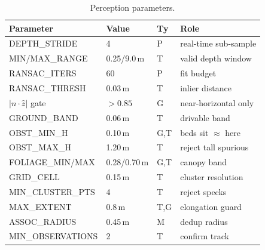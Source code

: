 \documentclass[10pt,journal,twoside]{IEEEtran}
\begin{document}
\begin{table}[!t]
\centering
\caption{Perception parameters.}
\label{tab:cfg1}
\footnotesize
\begin{tabular}{@{}lll l@{}}
\toprule
\textbf{Parameter} & \textbf{Value} & \textbf{Ty} & \textbf{Role} \\
\midrule
DEPTH\_STRIDE & 4 & P & real-time sub-sample \\
MIN/MAX\_RANGE & 0.25/9.0\,m & T & valid depth window \\
RANSAC\_ITERS & 60 & P & fit budget \\
RANSAC\_THRESH & 0.03\,m & T & inlier distance \\
$|n\cdot\hat z|$ gate & $>0.85$ & G & near-horizontal only \\
GROUND\_BAND & 0.06\,m & T & drivable band \\
OBST\_MIN\_H & 0.10\,m & G,T & beds sit $\approx$ here \\
OBST\_MAX\_H & 1.20\,m & T & reject tall spurious \\
FOLIAGE\_MIN/MAX & 0.28/0.70\,m & G,T & canopy band \\
GRID\_CELL & 0.15\,m & T & cluster resolution \\
MIN\_CLUSTER\_PTS & 4 & T & reject specks \\
MAX\_EXTENT & 0.8\,m & T,G & elongation guard \\
ASSOC\_RADIUS & 0.45\,m & M & dedup radius \\
MIN\_OBSERVATIONS & 2 & T & confirm track \\
\bottomrule
\end{tabular}
\end{table}
\end{document}
